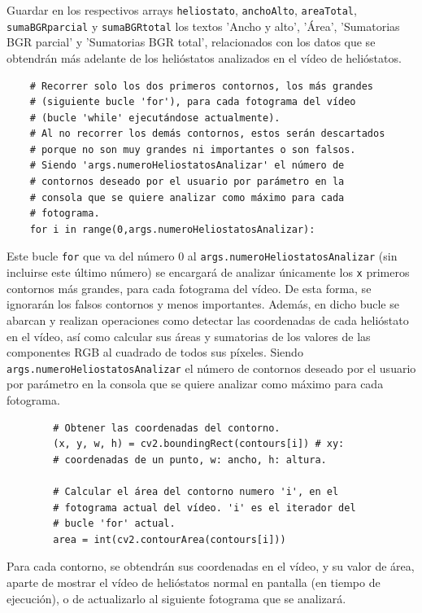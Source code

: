     Guardar en los respectivos arrays \verb|heliostato|, \verb|anchoAlto|, \verb|areaTotal|, \verb|sumaBGRparcial| y \verb|sumaBGRtotal| los textos 'Ancho y alto', 'Área', 'Sumatorias BGR parcial' y 'Sumatorias BGR total', relacionados con los datos que se obtendrán más adelante de los helióstatos analizados en el vídeo de helióstatos.

\begin{lstlisting}
    # Recorrer solo los dos primeros contornos, los más grandes
    # (siguiente bucle 'for'), para cada fotograma del vídeo
    # (bucle 'while' ejecutándose actualmente).
    # Al no recorrer los demás contornos, estos serán descartados
    # porque no son muy grandes ni importantes o son falsos.
    # Siendo 'args.numeroHeliostatosAnalizar' el número de
    # contornos deseado por el usuario por parámetro en la
    # consola que se quiere analizar como máximo para cada
    # fotograma.
    for i in range(0,args.numeroHeliostatosAnalizar):
\end{lstlisting}

Este bucle \verb|for| que va del número 0 al \verb|args.numeroHeliostatosAnalizar| (sin incluirse este último número) se encargará de analizar únicamente los \verb|x| primeros contornos más grandes, para cada fotograma del vídeo. De esta forma, se ignorarán los falsos contornos y menos importantes. Además, en dicho bucle se abarcan y realizan operaciones como detectar las coordenadas de cada helióstato en el vídeo, así como calcular sus áreas y sumatorias de los valores de las componentes RGB al cuadrado de todos sus píxeles. Siendo \verb|args.numeroHeliostatosAnalizar| el número de contornos deseado por el usuario por parámetro en la consola que se quiere analizar como máximo para cada fotograma.        
        
\begin{lstlisting}
        # Obtener las coordenadas del contorno.
        (x, y, w, h) = cv2.boundingRect(contours[i]) # xy:
        # coordenadas de un punto, w: ancho, h: altura.

        # Calcular el área del contorno numero 'i', en el
        # fotograma actual del vídeo. 'i' es el iterador del
        # bucle 'for' actual.
        area = int(cv2.contourArea(contours[i]))
\end{lstlisting}
        
Para cada contorno, se obtendrán sus coordenadas en el vídeo, y su valor de área, aparte de mostrar el vídeo de helióstatos normal en pantalla (en tiempo de ejecución), o de actualizarlo al siguiente fotograma que se analizará.

